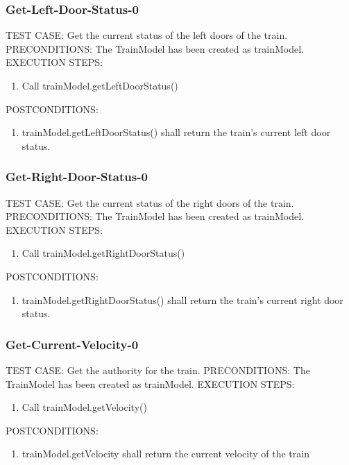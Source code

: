 \documentclass{scrreprt}
\begin{document}
\subsubsection{Get-Left-Door-Status-0}
TEST CASE: Get the current status of the left doors of the train.
PRECONDITIONS: The TrainModel has been created as trainModel.
EXECUTION STEPS:
\begin{enumerate}
	\item Call trainModel.getLeftDoorStatus()
\end{enumerate}
POSTCONDITIONS:
\begin{enumerate}
	\item trainModel.getLeftDoorStatus() shall return the train's current left door status.
\end{enumerate}

\subsubsection{Get-Right-Door-Status-0}
TEST CASE: Get the current status of the right doors of the train.
PRECONDITIONS: The TrainModel has been created as trainModel.
EXECUTION STEPS:
\begin{enumerate}
	\item Call trainModel.getRightDoorStatus()
\end{enumerate}
POSTCONDITIONS:
\begin{enumerate}
	\item trainModel.getRightDoorStatus() shall return the train's current right door status.
\end{enumerate}

\subsubsection{Get-Current-Velocity-0}
TEST CASE: Get the authority for the train.
PRECONDITIONS: The TrainModel has been created as trainModel.
EXECUTION STEPS:
\begin{enumerate}
	\item Call trainModel.getVelocity()
\end{enumerate}
POSTCONDITIONS:
\begin{enumerate}
	\item trainModel.getVelocity shall return the current velocity of the train
\end{enumerate}
\end{document}
